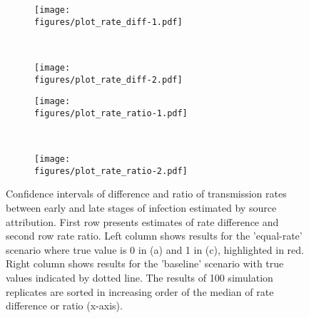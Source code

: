 \documentclass[preview]{standalone}
\newcommand{\figures}{./figure}
\begin{document}
\begin{figure}
    \centering
    \begin{subfigure}[b]{0.45\textwidth}
        \caption{}
        \texttt{[image: \\figures/plot\_rate\_diff-1.pdf]}
        \label{fig3a}
    \end{subfigure}
    ~ 
    \begin{subfigure}[b]{0.45\textwidth}
        \caption{}
        \texttt{[image: \\figures/plot\_rate\_diff-2.pdf]}        
        \label{fig3b}
    \end{subfigure}
    
    \begin{subfigure}[b]{0.45\textwidth}
        \caption{}
        \texttt{[image: \\figures/plot\_rate\_ratio-1.pdf]}        
        \label{fig3c}
    \end{subfigure}
    ~
     \begin{subfigure}[b]{0.45\textwidth}
        \caption{}
        \texttt{[image: \\figures/plot\_rate\_ratio-2.pdf]}        
        \label{fig3d}
    \end{subfigure}
   \caption[Confidence intervals of difference and ratio of transmission rates between early and late stages of infection estimated by source attribution]{Confidence intervals of difference and ratio of transmission rates between early and late stages of infection estimated by source attribution. First row presents estimates of rate difference and second row rate ratio. Left column shows results for the 'equal-rate' scenario where true value is 0 in (a) and 1 in (c), highlighted in red. Right column shows results for the 'baseline' scenario with true values indicated by dotted line. The results of 100 simulation replicates are sorted in increasing order of the median of rate difference or ratio (x-axis).}
   \label{fig3}
\end{figure}
\end{document}

